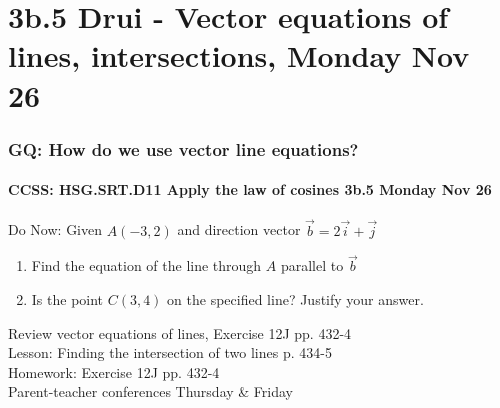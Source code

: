 \documentclass{beamer}
\begin{document}
  \section{3b.5 Drui - Vector equations of lines, intersections, Monday Nov 26}
    \frame
    {
      \frametitle{GQ: How do we use vector line equations?}
      \framesubtitle{CCSS: HSG.SRT.D11 Apply the law of cosines \qquad \alert{3b.5 Monday Nov 26}}

        Do Now: Given $A(-3,2)$ and direction vector $\overrightarrow{b} =2\overrightarrow{i}+\overrightarrow{j}$
        \begin{enumerate}
          \item Find the equation of the line through $A$ parallel to $\overrightarrow{b}$
          \item Is the point $C(3,4)$ on the specified line? Justify your answer.
        \end{enumerate}
        \hspace{2cm}

      Review vector equations of lines, Exercise 12J pp. 432-4\\
      Lesson: Finding the intersection of two lines p. 434-5\\
      Homework: Exercise 12J pp. 432-4\\
      \alert{Parent-teacher conferences Thursday \& Friday}
    }
\end{document}
